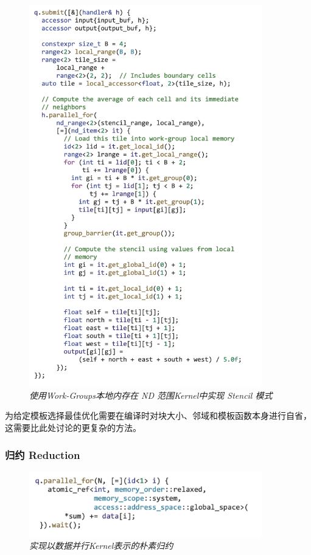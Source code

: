 \begin{figure}[H]
	\centering
	\includegraphics[width=0.9\textwidth]{figs/F14.17.png}
	\caption{\textit{使用Work-Groups本地内存在 ND 范围Kernel中实现 Stencil 模式 }}
\end{figure}

为给定模板选择最佳优化需要在编译时对块大小、邻域和模板函数本身进行自省，这需要比此处讨论的更复杂的方法。

\subsubsection{归约 Reduction}
\begin{figure}[H]
	\centering
	\includegraphics[width=0.9\textwidth]{figs/F14.18.png}
	\caption{\textit{实现以数据并行Kernel表示的朴素归约 }}
\end{figure}

